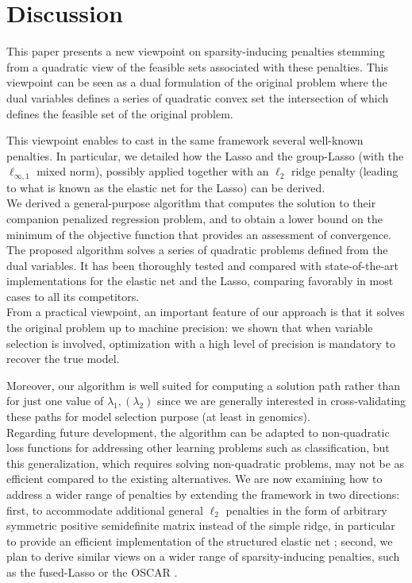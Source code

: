 \section{Discussion}


This  paper presents  a new  viewpoint on  sparsity-inducing penalties
stemming from  a quadratic view  of the feasible sets  associated with
these penalties. This  viewpoint can be seen as a  dual formulation of
the  original problem  where the  dual variables  defines a  series of
quadratic convex  set the intersection  of which defines  the feasible
set of the original problem.

This  viewpoint  enables  to  cast   in  the  same  framework  several
well-known penalties. In particular, we detailed how the Lasso and the
group-Lasso (with the $\ell_{\infty,1}$  mixed norm), possibly applied
together with an  $\ell_2$ ridge penalty (leading to what  is known as
the elastic net for the Lasso) can be derived. 
\\

We derived a  general-purpose algorithm that computes  the solution to
their companion  penalized regression problem,  and to obtain  a lower
bound  on the  minimum  of  the objective  function  that provides  an
assessment of convergence.  The proposed  algorithm solves a series of
quadratic  problems defined  from  the dual  variables.   It has  been
thoroughly tested  and compared with  state-of-the-art implementations
for the elastic  net and the Lasso, comparing favorably  in most cases
to all its competitors.%
\\

From a  practical viewpoint, an  important feature of our  approach is
that it solves the original problem  up to machine precision: we shown
that when  variable selection  is involved,  optimization with  a high
level of precision is mandatory to recover the true model.

Moreover, our algorithm  is well suited for computing  a solution path
rather than  for just one  value of $\lambda_1, (\lambda_2)$  since we
are  generally interested  in cross-validating  these paths  for model
selection purpose (at least in genomics).
\\

Regarding  future  development,  the   algorithm  can  be  adapted  to
non-quadratic loss  functions for  addressing other  learning problems
such  as  classification,  but  this  generalization,  which  requires
solving non-quadratic  problems, may not  be as efficient  compared to
the  existing alternatives.   We are  now examining  how to  address a
wider range of penalties by extending the framework in two directions:
first,  to accommodate  additional general  $\ell_2$ penalties  in the
form of  arbitrary symmetric  positive semidefinite matrix  instead of
the simple ridge, in particular to provide an efficient implementation
of the  structured elastic  net \citep{2010_AOS_Slawski} ;  second, we
plan to  derive similar  views on a  wider range  of sparsity-inducing
penalties, such as the fused-Lasso or the OSCAR \citep{Bondell08}.
